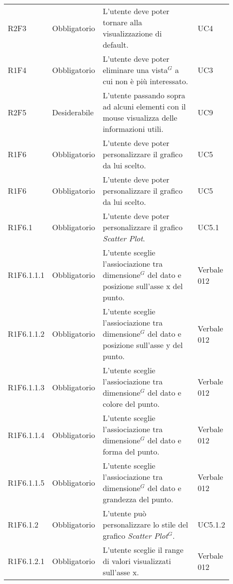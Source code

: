 {\begin{longtable}{p{0.12\linewidth}p{0.15\linewidth}p{0.50\linewidth}p{0.15\linewidth}}
    \rowcolor[RGB]{216, 235, 171}
    R2F3 & Obbligatorio & L'utente deve poter tornare alla visualizzazione di default. & UC4\\

    \rowcolor[RGB]{216, 235, 171}
    R1F4 & Obbligatorio & L'utente deve poter eliminare una vista$^{G}$ a cui non è più interessato. & UC3\\

    \rowcolor[RGB]{233, 245, 206}
    R2F5 & Desiderabile & L'utente passando sopra ad alcuni elementi con il mouse visualizza delle informazioni utili. & UC9\\

    \rowcolor[RGB]{216, 235, 171}
    R1F6 & Obbligatorio & L'utente deve poter personalizzare il grafico da lui scelto. & UC5\\
    \rowcolor[RGB]{233, 245, 206}
    R1F6 & Obbligatorio & L'utente deve poter personalizzare il grafico da lui scelto. & UC5\\
    \rowcolor[RGB]{216, 235, 171}
    R1F6.1 & Obbligatorio & L'utente deve poter personalizzare il grafico \textit{Scatter Plot}. & UC5.1\\
    \rowcolor[RGB]{233, 245, 206}
    R1F6.1.1.1 & Obbligatorio & L'utente sceglie l'assiociazione tra dimensione$^{G}$ del dato e posizione sull'asse x del punto.& Verbale 012\\
    \rowcolor[RGB]{216, 235, 171}
    R1F6.1.1.2 & Obbligatorio & L'utente sceglie l'assiociazione tra dimensione$^{G}$ del dato e posizione sull'asse y del punto.& Verbale 012\\
    \rowcolor[RGB]{233, 245, 206}
    R1F6.1.1.3 & Obbligatorio & L'utente sceglie l'assiociazione tra dimensione$^{G}$ del dato e colore del punto.& Verbale 012\\
    \rowcolor[RGB]{216, 235, 171}
    R1F6.1.1.4 & Obbligatorio & L'utente sceglie l'assiociazione tra dimensione$^{G}$ del dato e forma del punto.& Verbale 012\\
    \rowcolor[RGB]{233, 245, 206}
    R1F6.1.1.5 & Obbligatorio & L'utente sceglie l'assiociazione tra dimensione$^{G}$ del dato e grandezza del punto.& Verbale 012\\
    \rowcolor[RGB]{216, 235, 171}
    R1F6.1.2 & Obbligatorio & L'utente può personalizzare lo stile del grafico \textit{Scatter Plot$^{G}$}. & UC5.1.2\\
    \rowcolor[RGB]{233, 245, 206}
    R1F6.1.2.1 & Obbligatorio & L'utente sceglie il range di valori visualizzati sull'asse x. & Verbale 012 \\

\end{longtable}}
